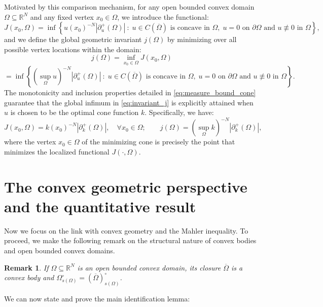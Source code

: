 \documentclass[10pt,a4paper]{amsart}
\newtheorem{remark}[theorem]{Remark}
\numberwithin{equation}{section}
\begin{document}
\noindent Motivated by this comparison mechanism, for any open bounded convex domain $\Omega \subseteq\mathbb{R}^N$ and any fixed vertex $x_0 \in \Omega$, we introduce the functional:
\begin{equation}\label{eq:functional_J}
J(x_0, \Omega) = \inf \left\{ u(x_0)^{-N} |\partial^+_u (\Omega)| \ : \; u \in C({\overline{\Omega}}) \text{ is concave in } \Omega, \; u = 0 \text{ on } \partial \Omega \text{ and }u\not \equiv 0 \text { in }\Omega \right\},
\end{equation}
and we define the global geometric invariant $j(\Omega)$ by minimizing over all possible vertex locations within the domain:
\begin{equation}\label{eq:invariant_j}
j(\Omega) = \inf_{x_0 \in \Omega} J(x_0, \Omega)
\end{equation}
$$= \inf \left\{ (\sup_\Omega u)^{-N} |\partial^+_u(\Omega)| \ : \; u \in C({\overline{\Omega}}) \text{ is concave in } \Omega, \; u = 0 \text{ on } \partial \Omega \text{ and }u\not \equiv 0 \text { in }\Omega \right\}.$$
The monotonicity and inclusion properties detailed in \eqref{eq:measure_bound_cone} guarantee that the global infimum in \eqref{eq:invariant_j} is explicitly attained when $u$ is chosen to be the optimal cone function $k$. Specifically, we have:
\begin{equation}\label{eq:brought1}
J(x_0, \Omega)=k(x_0)^{-N}|\partial^+_k(\Omega)|, \quad \forall x_0 \in \Omega; \qquad j(\Omega) = (\sup_\Omega k)^{-N}|\partial^+_k(\Omega)|,
\end{equation}
where the vertex $x_0 \in \Omega$ of the minimizing cone is precisely the point that minimizes the localized functional $J(\cdot, \Omega)$.

\section{The convex geometric perspective and the quantitative result}
Now we focus on the link with convex geometry and the Mahler inequality. To proceed, we make the following remark on the structural nature of convex bodies and open bounded convex domains.

\begin{remark}
    If $\Omega \subseteq\mathbb{R}^N$ is an open bounded convex domain, its closure $\overline{\Omega}$ is a convex body and $\Omega^\circ_{s(\Omega)}=(\overline{\Omega})^\circ_{s(\Omega)}$.
\end{remark}

\noindent We can now state and prove the main identification lemma:
\end{document}
